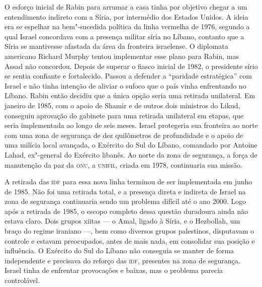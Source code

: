 O esforço inicial de Rabin para arrumar a casa tinha por objetivo chegar
a um entendimento indireto com a Síria, por intermédio dos Estados
Unidos. A ideia era se espelhar na bem"-sucedida política da linha
vermelha de 1976, segundo a qual Israel concordava com a presença
militar síria no Líbano, contanto que a Síria se mantivesse afastada da
área da fronteira israelense. O diplomata americano Richard Murphy
tentou implementar esse plano para Rabin, mas Assad não concordou. Depois
de superar o fiasco inicial de 1982, o presidente sírio se sentia
confiante e fortalecido. Passou a defender a ``paridade estratégica''
com Israel e não tinha intenção de aliviar o sufoco que o país vinha
enfrentando no Líbano. Rabin então decidiu que a única opção seria uma
retirada unilateral. Em janeiro de 1985, com o apoio de Shamir e de
outros dois ministros do Likud, conseguiu aprovação do gabinete para uma
retirada unilateral em etapas, que seria implementada ao longo de seis
meses. Israel protegeria sua fronteira ao norte com uma zona de
segurança de dez quilômetros de profundidade e o apoio de uma milícia
local avançada, o Exército do Sul do Líbano, comandado por Antoine
Lahad, ex"-general do Exército libanês. Ao norte da zona de segurança, a
força de manutenção da paz da \textsc{onu}, a \textsc{unifil}, criada em 1978, continuaria
sua missão.

A retirada das \textsc{idf} para essa nova linha terminou de ser implementada em
junho de 1985. Não foi uma retirada total, e a presença direta
e indireta de Israel na zona de segurança continuaria sendo um problema
difícil até o ano 2000. Logo após a retirada de 1985, o escopo completo
dessa questão duradoura ainda não estava claro. Dois grupos xiitas --- o
Amal, ligado à Síria, e o Hezbollah, um braço do regime iraniano ---, bem
como diversos grupos palestinos, disputavam o controle e estavam
preocupados, antes de mais nada, em consolidar sua posição e influência.
O Exército do Sul do Líbano não conseguia se manter de forma
independente e precisava do reforço das \textsc{idf}, presentes na zona de
segurança. Israel tinha de enfrentar provocações e baixas, mas o
problema parecia controlável.

